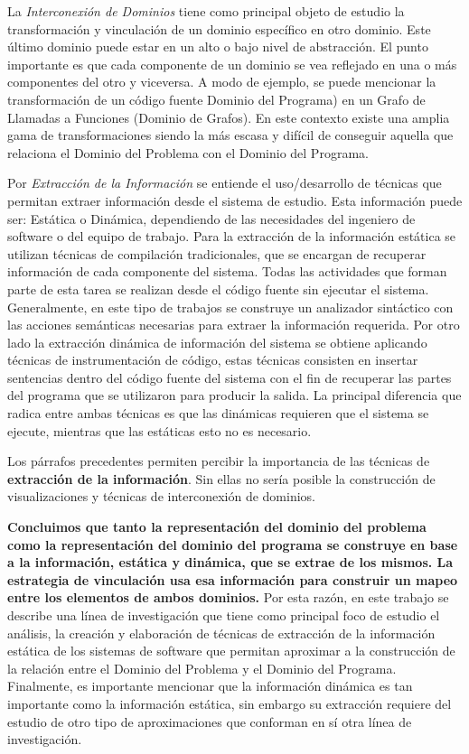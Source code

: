 \documentclass[12pt]{report}
\begin{document}
La \textit{Interconexión de Dominios} \cite{BRM10} tiene como principal objeto de estudio la transformación y vinculación de un dominio específico en otro dominio. 
Este último dominio puede estar en un alto o bajo nivel de abstracción. 
El punto importante es que cada componente de un dominio se vea reflejado en una o más componentes del otro y viceversa. 
A modo de ejemplo, se puede mencionar la transformación de un código fuente Dominio del Programa) en un Grafo de Llamadas a Funciones (Dominio de Grafos). En este contexto existe una amplia gama de transformaciones siendo la más escasa y difícil de conseguir aquella que relaciona el Dominio del Problema con el Dominio del Programa.

Por \textit{Extracción de la Información} se entiende el uso/desarrollo de técnicas que 
permitan extraer información desde el sistema de estudio. 
Esta información puede ser: Estática o Dinámica, dependiendo de las necesidades del 
ingeniero de software o del equipo de trabajo.
Para la extracción de la información estática se utilizan técnicas de compilación tradicionales, que se encargan de recuperar información de cada componente del sistema. Todas las actividades que forman parte de esta tarea se realizan desde el código fuente sin ejecutar el sistema. Generalmente, en este tipo de trabajos se construye un analizador sintáctico con las acciones semánticas necesarias para extraer la información requerida.
Por otro lado la extracción dinámica de información del sistema se obtiene  
aplicando técnicas de instrumentación de código, estas técnicas consisten en insertar sentencias dentro del código fuente del sistema con el fin de recuperar las partes del programa que se utilizaron para 
producir la salida. 
La principal diferencia que radica entre ambas técnicas es que las dinámicas requieren que el sistema se ejecute, mientras que las estáticas esto no es necesario.

Los párrafos precedentes permiten percibir la importancia de las técnicas de 
\textbf{extracción de la información}. 
Sin ellas no sería posible la construcción de visualizaciones y técnicas de 
interconexión de dominios\cite{BRM10}. 

\textbf{Concluimos que tanto la representación del dominio del problema como la representación del dominio del programa se construye en base a la información, estática y dinámica, que se extrae de los mismos. 
La estrategia de vinculación usa esa información para construir un mapeo entre los elementos de ambos dominios.}
Por esta razón, en este trabajo se describe una línea de investigación que tiene 
como principal foco de estudio el análisis, la creación y elaboración de técnicas de extracción de la información estática de los sistemas de software que permitan aproximar a la construcción de la relación entre el Dominio del Problema y el Dominio del Programa.
Finalmente, es importante mencionar que la información dinámica es tan importante como la información estática, sin embargo su extracción requiere del estudio de otro tipo de aproximaciones que conforman en sí otra línea de investigación.
\end{document}

